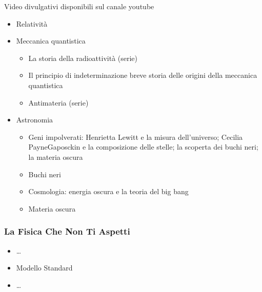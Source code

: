 \documentclass[letterpaper,10pt,italian]{jupyterBook}
\begin{document}
\sphinxAtStartPar
Video divulgativi disponibili sul canale youtube 
\begin{itemize}
\item {} 
\sphinxAtStartPar
Relatività

\item {} 
\sphinxAtStartPar
Meccanica quantistica
\begin{itemize}
\item {} 
\sphinxAtStartPar
La storia della radioattività (serie)

\item {} 
\sphinxAtStartPar
Il principio di indeterminazione \sphinxhyphen{} breve storia delle origini della meccanica quantistica

\item {} 
\sphinxAtStartPar
Antimateria (serie)

\end{itemize}

\item {} 
\sphinxAtStartPar
Astronomia
\begin{itemize}
\item {} 
\sphinxAtStartPar
Geni impolverati: Henrietta Lewitt e la misura dell’universo; Cecilia Payne\sphinxhyphen{}Gaposckin e la composizione delle stelle; la scoperta dei buchi neri; la materia oscura

\item {} 
\sphinxAtStartPar
Buchi neri

\item {} 
\sphinxAtStartPar
Cosmologia: energia oscura e la teoria del big bang

\item {} 
\sphinxAtStartPar
Materia oscura

\end{itemize}

\end{itemize}
\subsubsection*{La Fisica Che Non Ti Aspetti}
\begin{itemize}
\item {} 
\sphinxAtStartPar
…

\item {} 
\sphinxAtStartPar
Modello Standard

\item {} 
\sphinxAtStartPar
…

\end{itemize}
\end{document}
